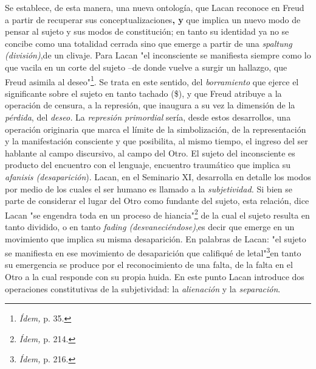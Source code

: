 Se establece, de esta manera, una nueva ontología, que Lacan reconoce en
Freud a partir de recuperar sus conceptualizaciones\textbf{, y} que
implica un nuevo modo de pensar al sujeto y sus modos de constitución;
en tanto su identidad ya no se concibe como una totalidad cerrada sino
que emerge a partir de una \emph{spaltung (división)},de un clivaje.
Para Lacan "el inconsciente se manifiesta siempre como lo que vacila en
un corte del sujeto --de donde vuelve a surgir un hallazgo, que Freud
asimila al deseo"\footnote{\emph{Ídem,} p. 35.}. Se trata en este
sentido, del \emph{borramiento} que ejerce el significante sobre el
sujeto en tanto tachado (\$), y que Freud atribuye a la operación de
censura, a la represión, que inaugura a su vez la dimensión de la
\emph{pérdida}, del \emph{deseo.} La \emph{represión primordial} sería,
desde estos desarrollos, una operación originaria que marca el límite de
la simbolización, de la representación y la manifestación consciente y
que posibilita, al mismo tiempo, el ingreso del ser hablante al campo
discursivo, al campo del Otro. El sujeto del inconsciente es producto
del encuentro con el lenguaje, encuentro traumático que implica su
\emph{afanisis (desaparición}). Lacan, en el Seminario XI, desarrolla en
detalle los modos por medio de los cuales el ser humano es llamado a la
\emph{subjetividad.} Si bien se parte de considerar el lugar del Otro
como fundante del sujeto, esta relación, dice Lacan "se engendra toda en
un proceso de hiancia"\footnote{\emph{Ídem,} p. 214.} de la cual el
sujeto resulta en tanto dividido, o en tanto \emph{fading
(desvaneciéndose)},es decir que emerge en un movimiento que implica su
misma desaparición. En palabras de Lacan: "el sujeto se manifiesta en
ese movimiento de desaparición que califiqué de letal"\footnote{\emph{Ídem,}
  p. 216.}en tanto su emergencia se produce por el reconocimiento de una
falta, de la falta en el Otro a la cual responde con su propia huida. En
este punto Lacan introduce dos operaciones constitutivas de la
subjetividad: la \emph{alienación} y la \emph{separación}.

